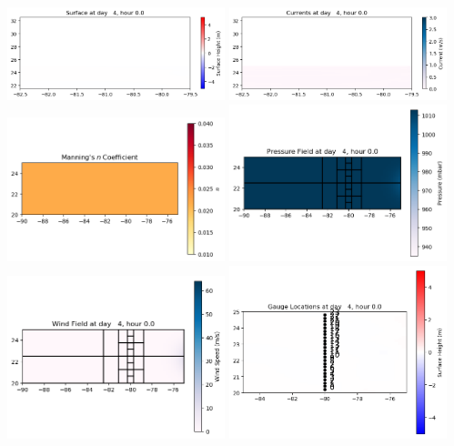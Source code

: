 \documentclass[11pt]{article}
\begin{document}
\vskip 10pt 
\includegraphics[width=0.475\textwidth]{frame0016fig1003.png}
\includegraphics[width=0.475\textwidth]{frame0016fig1004.png}
\vskip 10pt 
\includegraphics[width=0.475\textwidth]{frame0016fig1005.png}
\includegraphics[width=0.475\textwidth]{frame0016fig1006.png}
\vskip 10pt 
\includegraphics[width=0.475\textwidth]{frame0016fig1007.png}
\includegraphics[width=0.475\textwidth]{frame0016fig1008.png}
\end{document}
